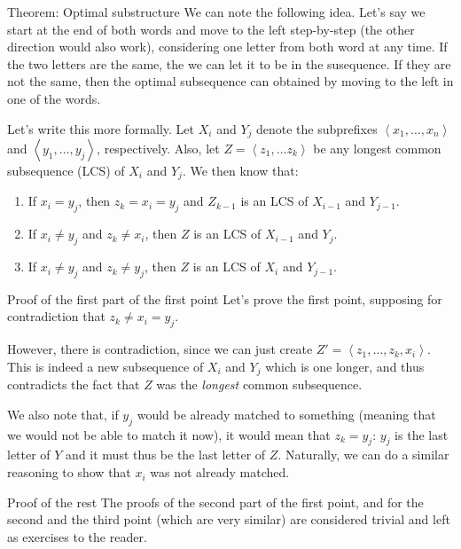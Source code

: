 \documentclass[a4paper]{article}
\begin{document}
\begin{parag}{Theorem: Optimal substructure}
    We can note the following idea. Let's say we start at the end of both words and move to the left step-by-step (the other direction would also work), considering one letter from both word at any time. If the two letters are the same, the we can let it to be in the susequence. If they are not the same, then the optimal subsequence can obtained by moving to the left in one of the words.

    Let's write this more formally. Let $X_i$ and $Y_j$ denote the subprefixes $\left\langle x_1, \ldots, x_n \right\rangle$ and $\left\langle y_1, \ldots, y_j \right\rangle$, respectively. Also, let $Z = \left\langle z_1, \ldots z_k \right\rangle$ be any longest common subsequence (LCS) of $X_i$ and $Y_j$. We then know that:
    \begin{enumerate}
        \item If $x_i = y_j$, then $z_k = x_i = y_j$ and $Z_{k-1}$ is an LCS of $X_{i-1}$ and $Y_{j-1}$.
        \item If $x_i \neq y_j$ and $z_k \neq x_i$, then $Z$ is an LCS of $X_{i-1}$ and $Y_j$.
        \item If $x_i \neq y_j$ and $z_k \neq y_j$, then $Z$ is an LCS of $X_i$ and $Y_{j-1}$.
    \end{enumerate}

    \begin{subparag}{Proof of the first part of the first point}
        Let's prove the first point, supposing for contradiction that $z_k \neq x_i = y_j$.

        However, there is contradiction, since we can just create $Z' = \left\langle z_1, \ldots, z_k, x_i \right\rangle$. This is indeed a new subsequence of $X_i$ and $Y_j$ which is one longer, and thus contradicts the fact that $Z$ was the \textit{longest} common subsequence.

        We also note that, if $y_j$ would be already matched to something (meaning that we would not be able to match it now), it would mean that $z_k = y_j$: $y_j$ is the last letter of $Y$ and it must thus be the last letter of $Z$. Naturally, we can do a similar reasoning to show that $x_i$ was not already matched.
    \end{subparag}

    \begin{subparag}{Proof of the rest}
        The proofs of the second part of the first point, and for the second and the third point (which are very similar) are considered trivial and left as exercises to the reader. \smiley
    \end{subparag}
\end{parag}
\end{document}
